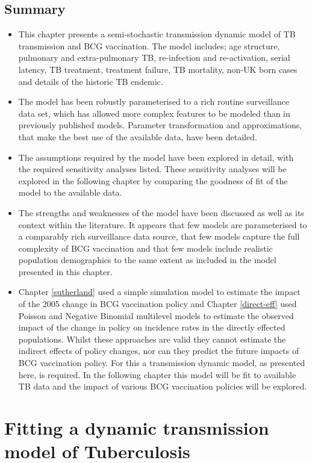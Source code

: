\documentclass[11pt,twoside]{bristolthesis}
\begin{document}
  \hypertarget{summary-7}{%
  \section{Summary}\label{summary-7}}
  \begin{itemize}
  \item
    This chapter presents a semi-stochastic transmission dynamic model of TB transmission and BCG vaccination. The model includes; age structure, pulmonary and extra-pulmonary TB, re-infection and re-activation, serial latency, TB treatment, treatment failure, TB mortality, non-UK born cases and details of the historic TB endemic.
  \item
    The model has been robustly parameterised to a rich routine surveillance data set, which has allowed more complex features to be modeled than in previously published models. Parameter transformation and approximations, that make the best use of the available data, have been detailed.
  \item
    The assumptions required by the model have been explored in detail, with the required sensitivity analyses listed. These sensitivity analyses will be explored in the following chapter by comparing the goodness of fit of the model to the available data.
  \item
    The strengths and weaknesses of the model have been discussed as well as its context within the literature. It appears that few models are parameterised to a comparably rich surveillance data source, that few models capture the full complexity of BCG vaccination and that few models include realistic population demographics to the same extent as included in the model presented in this chapter.
  \item
    Chapter \ref{sutherland} used a simple simulation model to estimate the impact of the 2005 change in BCG vaccination policy and Chapter \ref{direct-eff} used Poisson and Negative Binomial multilevel models to estimate the observed impact of the change in policy on incidence rates in the directly effected populations. Whilst these approaches are valid they cannot estimate the indirect effects of policy changes, nor can they predict the future impacts of BCG vaccination policy. For this a transmission dynamic model, as presented here, is required. In the following chapter this model will be fit to available TB data and the impact of various BCG vaccination policies will be explored.
  \end{itemize}
  \hypertarget{model-fitting}{%
  \chapter{Fitting a dynamic transmission model of Tuberculosis}\label{model-fitting}}
  
\end{document}
